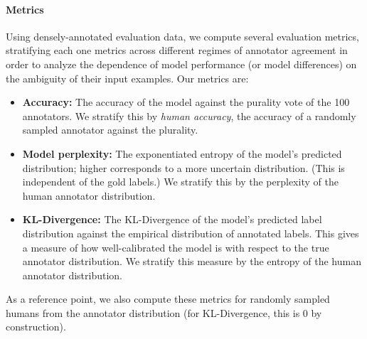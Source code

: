 \documentclass[10pt,a4paper]{article}
\begin{document}
\paragraph{Metrics}
Using densely-annotated evaluation data, we compute several evaluation metrics, stratifying each one metrics across different regimes of annotator agreement in order to analyze the dependence of model performance (or model differences) on the ambiguity of their input
examples.
Our metrics are:
\begin{itemize}
    \item \textbf{Accuracy:} The accuracy of the model against the purality vote of the 100 annotators. We stratify this by \textit{human accuracy}, the accuracy of a randomly sampled annotator against the plurality.
    \item \textbf{Model perplexity:} The exponentiated entropy of the model's predicted distribution; higher corresponds to a more uncertain distribution. (This is independent of the gold labels.) We stratify this by the perplexity of the human annotator distribution.
    \item \textbf{KL-Divergence:} The KL-Divergence of the model's predicted label distribution against the empirical distribution of annotated labels. This gives a measure of how well-calibrated the model is with respect to the true annotator distribution. We stratify this measure by the entropy of the human annotator distribution.
\end{itemize}
As a reference point, we also compute these metrics for randomly sampled humans from the annotator distribution (for KL-Divergence, this is 0 by construction).
\end{document}
